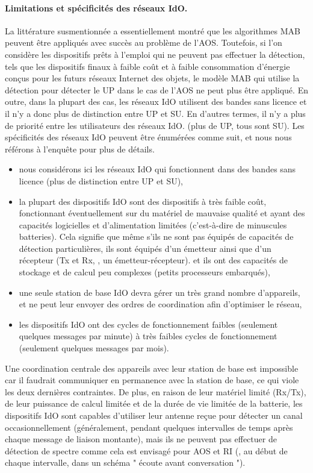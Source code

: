 \begin{resume_fr}
\paragraph{Limitations et spécificités des réseaux IdO.}
%
La littérature susmentionnée a essentiellement montré que les algorithmes MAB peuvent être appliqués avec succès au problème de l'AOS.
Toutefois, si l'on considère les dispositifs prêts à l'emploi qui ne peuvent pas effectuer la détection, tels que les dispositifs finaux à faible coût et à faible consommation d'énergie conçus pour les futurs réseaux Internet des objets, le modèle MAB qui utilise la détection pour détecter le UP dans le cas de l'AOS ne peut plus être appliqué.
En outre, dans la plupart des cas, les réseaux IdO utilisent des bandes sans licence et il n'y a donc plus de distinction entre UP et SU.
En d'autres termes, il n'y a plus de priorité entre les utilisateurs des réseaux IdO.
(plus de UP, tous sont SU).
%
Les spécificités des réseaux IdO peuvent être énumérées comme suit,
et nous nous référons à l'enquête \cite{Centenaro16} pour plus de détails.
%
\begin{itemize}\tightlist
    \item
    nous considérons ici les réseaux IdO qui fonctionnent dans des bandes sans licence (plus de distinction entre UP et SU),
    \item
    la plupart des dispositifs IdO sont des dispositifs à très faible coût, fonctionnant éventuellement sur du matériel de mauvaise qualité et ayant des capacités logicielles et d'alimentation limitées (c'est-à-dire de minuscules batteries).
    Cela signifie que même s'ils ne sont pas équipés de capacités de détection particulières,
    ils sont équipés d'un émetteur ainsi que d'un récepteur (Tx et Rx, \ie, un émetteur-récepteur).
    et ils ont des capacités de stockage et de calcul peu complexes (petits processeurs embarqués),
    \item
    une seule station de base IdO devra gérer un très grand nombre d'appareils,
    et ne peut leur envoyer des ordres de coordination afin d'optimiser le réseau,
    \item
    les dispositifs IdO ont des cycles de fonctionnement faibles (seulement quelques messages par minute) à très faibles cycles de fonctionnement (seulement quelques messages par mois).
\end{itemize}

Une coordination centrale des appareils avec leur station de base est impossible car il faudrait communiquer en permanence avec la station de base, ce qui viole les deux dernières contraintes.
%
De plus, en raison de leur matériel limité (Rx/Tx), de leur puissance de calcul limitée et de la durée de vie limitée de la batterie, les dispositifs IdO sont capables d'utiliser leur antenne reçue pour détecter un canal occasionnellement (généralement, pendant quelques intervalles de temps après chaque message de liaison montante), mais ils ne peuvent pas effectuer de détection de spectre comme cela est envisagé pour AOS et RI (\ie, au début de chaque intervalle, dans un schéma " écoute avant conversation ").


\end{resume_fr}
